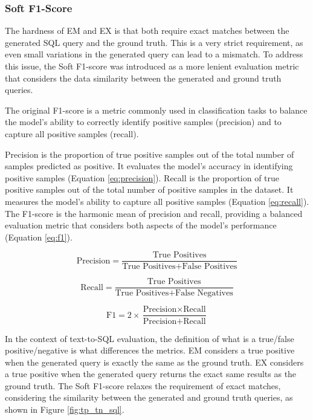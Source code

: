 \subsubsection{Soft F1-Score}

The hardness of EM and EX is that both require exact matches between the generated SQL query and the ground truth. This is a very strict requirement, as even small variations in the generated query can lead to a mismatch. To address this issue, the Soft F1-score was introduced as a more lenient evaluation metric that considers the data similarity between the generated and ground truth queries. 

The original F1-score is a metric commonly used in classification tasks to balance the model's ability to correctly identify positive samples (precision) and to capture all positive samples (recall). 

Precision is the proportion of true positive samples out of the total number of samples predicted as positive. It evaluates the model's accuracy in identifying positive samples (Equation \ref{eq:precision}). Recall is the proportion of true positive samples out of the total number of positive samples in the dataset. It measures the model's ability to capture all positive samples (Equation \ref{eq:recall}). The F1-score is the harmonic mean of precision and recall, providing a balanced evaluation metric that considers both aspects of the model's performance (Equation \ref{eq:f1}).

\begin{equation}
    \text{Precision} = \frac{\text{True Positives}}{\text{True Positives} + \text{False Positives}}
    \label{eq:precision}
\end{equation}

\begin{equation}
    \text{Recall} = \frac{\text{True Positives}}{\text{True Positives} + \text{False Negatives}}
    \label{eq:recall}
\end{equation}

\begin{equation}
    \text{F1} = 2 \times \frac{\text{Precision} \times \text{Recall}}{\text{Precision} + \text{Recall}}
    \label{eq:f1}
\end{equation}

In the context of text-to-SQL evaluation, the definition of what is a true/false positive/negative is what differences the metrics. EM considers a true positive when the generated query is exactly the same as the ground truth. EX considers a true positive when the generated query returns the exact same results as the ground truth. The Soft F1-score relaxes the requirement of exact matches, considering the similarity between the generated and ground truth queries, as shown in Figure \ref{fig:tp_tn_sql}.


